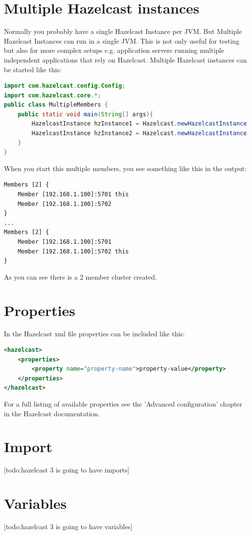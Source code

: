 \section{Multiple Hazelcast instances}
Normally you probably have a single Hazelcast Instance per JVM. But Multiple Hazelcast Instances can run in a single JVM. This is not only useful for testing but also for more complex setups e.g. application servers running multiple independent applications that rely on Hazelcast. Multiple Hazelcast instances can be started like this:
\begin{lstlisting}[language=java]
import com.hazelcast.config.Config;
import com.hazelcast.core.*;
public class MultipleMembers {
    public static void main(String[] args){
        HazelcastInstance hzInstance1 = Hazelcast.newHazelcastInstance();
        HazelcastInstance hzInstance2 = Hazelcast.newHazelcastInstance();
    }
}
\end{lstlisting}
When you start this multiple members, you see something like this in the output:
\begin{lstlisting}
Members [2] {
    Member [192.168.1.100]:5701 this
    Member [192.168.1.100]:5702
}
...
Members [2] {
    Member [192.168.1.100]:5701
    Member [192.168.1.100]:5702 this
}
\end{lstlisting}
As you can see there is a 2 member cluster created.

\section{Properties}
In the Hazelcast xml file properties can be included like this:
\begin{lstlisting}[language=xml]
<hazelcast>
    <properties>
        <property name="property-name">property-value</property>
    </properties>
</hazelcast>
\end{lstlisting}
For a full listing of available properties see the 'Advanced configuration' chapter in the Hazelcast documentation.

\section{Import}
[todo:hazelcast 3 is going to have imports]

\section{Variables}
[todo:hazelcast 3 is going to have variables] 

